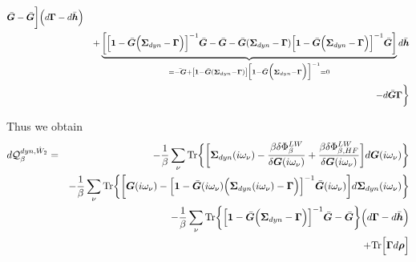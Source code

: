 \documentclass[11pt,a4paper]{report}
\begin{document}
\begin{eqnarray}
\bar{\bm{G}}
-\bar{\bm{G}}
\biggr]\Bigl(d\bm{\Gamma}-d\bar{\bm{h}}\Bigr)
\nonumber\\
&&
+\underbrace{\biggl[
\Bigl[\bm{1}-\bar{\bm{G}}
\Bigl(\bm{\Sigma}_{dyn}-\bm{\Gamma}\Bigr)\Bigr]^{-1}
\bar{\bm{G}}
-\bar{\bm{G}}
-\bar{\bm{G}}(\bm{\Sigma}_{dyn}-\bm{\Gamma})
\Bigl[\bm{1}-\bar{\bm{G}}
\Bigl(\bm{\Sigma}_{dyn}-\bm{\Gamma}\Bigr)\Bigr]^{-1}
\bar{\bm{G}}
\biggr]}_{
=\bar{-\bm{G}}
+\left[\bm{1}-\bar{\bm{G}}(\bm{\Sigma}_{dyn}-\bm{\Gamma})\right]
\Bigl[\bm{1}-\bar{\bm{G}}
\Bigl(\bm{\Sigma}_{dyn}-\bm{\Gamma}\Bigr)\Bigr]^{-1}
=0}
d\bar{\bm{h}}
\nonumber\\
&&
-d\bar{\bm{G}}\bm{\Gamma}
\biggr\rbrace
\end{eqnarray}

Thus we obtain
\begin{eqnarray}
d\mathcal{Q}_{\beta}^{dyn,\hat{W}_2}
&=&
-\frac{1}{\beta}\sum_\nu\mathrm{Tr}\biggl\lbrace
\biggr[\bm{\Sigma}_{dyn}(i\omega_\nu)
-\frac{\beta\delta\Phi^{LW}_\beta}{\delta\bm{G}(i\omega_\nu)}
+\frac{\beta\delta\Phi^{LW}_{\beta,HF}}{\delta\bm{G}(i\omega_\nu)}
\biggr]d\bm{G}(i\omega_\nu)\biggr\rbrace
\nonumber\\
&&
-\frac{1}{\beta}\sum_\nu\mathrm{Tr}\biggl\lbrace
\biggl[
\bm{G}(i\omega_\nu)-\Bigl[\bm{1}-\bar{\bm{G}}(i\omega_\nu)
\Bigl(\bm{\Sigma}_{dyn}(i\omega_\nu)-\bm{\Gamma}\Bigr)\Bigr]^{-1}
\bar{\bm{G}}(i\omega_\nu)\biggr]d\bm{\Sigma}_{dyn}(i\omega_\nu)
\biggr\rbrace
\nonumber\\
&&
-\frac{1}{\beta}\sum_\nu\mathrm{Tr}\biggl\lbrace
\Bigl[\bm{1}-\bar{\bm{G}}
\Bigl(\bm{\Sigma}_{dyn}-\bm{\Gamma}\Bigr)\Bigr]^{-1}
\bar{\bm{G}}
-\bar{\bm{G}}
\biggr\rbrace
\Bigl(d\bm{\Gamma}-d\bar{\bm{h}}\Bigr)
\nonumber\\
&&+\mathrm{Tr}\Bigl[\bm{\Gamma}d\bm{\rho}\Bigr]
\end{eqnarray}
\end{document}
